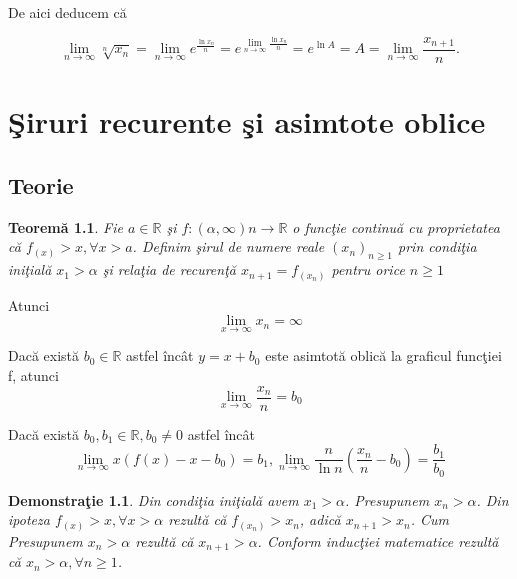 \documentclass[a4paper,12pt,oneside]{report}
\newtheorem{demonstration}{Demonstra\c tie}
\newtheorem{theorem}{Teorem\u a}
\begin{document}
De aici deducem c\u a 

\begin{displaymath}
  \lim_{n \to \infty }\sqrt[n]{x_{n}} = \lim_{n \to \infty } e^{\frac{\ln x_{n}}{n}} = e^{\lim_{n \to \infty } \frac{\ln x_{n}}{n}} = e^{\ln A} = A = \lim_{n \to \infty}\frac{x_{n+1}}{n}.
\end{displaymath}

\chapter{\c Siruri recurente \c si asimtote oblice}

\section{Teorie}

\begin{theorem}
   Fie \(a\in \mathbb{R}\) \c si \(f: \left ( \alpha ,\infty  \right )n \to \mathbb{R}\) o func\c tie continu\u a cu proprietatea c\u a \(f_{(x)}> x, \forall x > a\). Definim \c sirul de numere reale \(\left ( x_{n} \right )_{n\geq 1}\) prin condi\c tia ini\c tial\u a \(x_{1}> \alpha\) \c si rela\c tia de recuren\c t\u a \(x_{n+1} = f_{\left ( x_{n} \right )}\) pentru orice  \(n\geq 1	\)
\end{theorem}

Atunci 
\begin{displaymath}
  \lim_{x \to \infty }x_{n} = \infty
\end{displaymath}

Dac\u a exist\u a \(b_{0}\in \mathbb{R}\) astfel \^ inc\^ at \(y = x + b_{0}\) este asimtot\u a oblic\u a la graficul func\c tiei f, atunci
\begin{displaymath}
  \lim_{x \to \infty }\frac{x_{n}}{n}=b_{0}
\end{displaymath}

Dac\u a exist\u a \(b_{0}, b_{1}\in \mathbb{R}, b_{0 }\neq 0\) astfel \^ inc\^ at 
\begin{displaymath}
  \lim_{n \to \infty }x\left ( f\left ( x \right )-x-b_{0} \right )= b_{1},
\lim_{n \to \infty } \frac{n}{\ln n}\left ( \frac{x_{n}}{n} -b_{0}\right )=\frac{b_{1}}{b_{0}}
\end{displaymath}


\begin{demonstration}
  Din condi\c tia ini\c tial\u a avem \(x_{1}> \alpha\). Presupunem \(x_{n}> \alpha\).
Din ipoteza \(f_{\left ( x \right )}> x, \forall  x> \alpha\) rezult\u a c\u a \(f_{\left ( x _{n}\right )}> x_{n}\), adic\u a \(x_{n+1}> x_{n}\). Cum Presupunem \(x_{n}> \alpha\) rezult\u a c\u a \(x_{n+1}> \alpha\). Conform induc\c tiei matematice rezult\u a c\u a \(x_{n}> \alpha,  \forall n\geq 1\). 
\end{demonstration}
\end{document}
